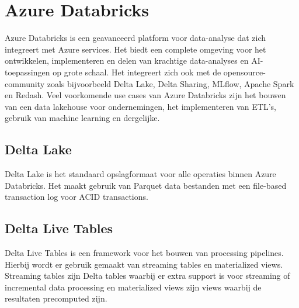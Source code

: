 %
%
%
%
%
%

\section{Azure Databricks}

Azure Databricks is een geavanceerd platform voor data-analyse dat zich integreert met Azure services. Het biedt een complete omgeving voor het ontwikkelen, implementeren en delen van krachtige data-analyses en AI-toepassingen op grote schaal. Het integreert zich ook met de opensource-community zoals bijvoorbeeld Delta Lake, Delta Sharing, MLflow, Apache Spark en Redash. Veel voorkomende use cases van Azure Databricks zijn het bouwen van een data lakehouse voor ondernemingen, het implementeren van ETL's, gebruik van machine learning en dergelijke.~\autocite{Microsoft2024}

\subsection{Delta Lake}

Delta Lake is het standaard opslagformaat voor alle operaties binnen Azure Databricks. Het maakt gebruik van Parquet data bestanden met een file-based transaction log voor ACID transactions.~\autocite{Microsoft2024c}

\subsection{Delta Live Tables}

Delta Live Tables is een framework voor het bouwen van processing pipelines. Hierbij wordt er gebruik gemaakt van streaming tables en materialized views. Streaming tables zijn Delta tables waarbij er extra support is voor streaming of incremental data processing en materialized views zijn views waarbij de resultaten precomputed zijn.~\autocite{Microsoft2024b}






